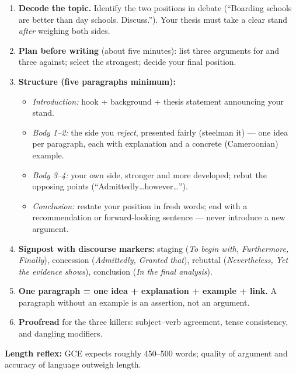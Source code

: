 \documentclass[11pt]{article}
\newcommand{\cle}[1]{{\popxbold\color{popdark}#1}}
\begin{document}
\begin{methode}
\begin{enumerate}
\item \textbf{Decode the topic.} Identify the two positions in debate (``Boarding schools are better than day schools. Discuss.''). Your thesis must take a clear stand \emph{after} weighing both sides.
\item \textbf{Plan before writing} (about five minutes): list three arguments for and three against; select the strongest; decide your final position.
\item \textbf{Structure (five paragraphs minimum):}
\begin{itemize}
\item \emph{Introduction:} hook + background + \cle{thesis statement} announcing your stand.
\item \emph{Body 1--2:} the side you \emph{reject}, presented fairly (steelman it) — one idea per paragraph, each with explanation and a concrete (Cameroonian) example.
\item \emph{Body 3--4:} your own side, stronger and more developed; rebut the opposing points (``Admittedly\ldots however\ldots'').
\item \emph{Conclusion:} restate your position in fresh words; end with a recommendation or forward-looking sentence — never introduce a new argument.
\end{itemize}
\item \textbf{Signpost with discourse markers:} staging (\emph{To begin with, Furthermore, Finally}), concession (\emph{Admittedly, Granted that}), rebuttal (\emph{Nevertheless, Yet the evidence shows}), conclusion (\emph{In the final analysis}).
\item \textbf{One paragraph = one idea + explanation + example + link.} A paragraph without an example is an assertion, not an argument.
\item \textbf{Proofread} for the three killers: subject--verb agreement, tense consistency, and dangling modifiers.
\end{enumerate}
\textbf{Length reflex:} GCE expects roughly 450--500 words; quality of argument and accuracy of language outweigh length.
\end{methode}
\end{document}
